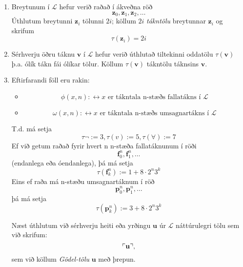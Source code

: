 \documentclass[12pt]{book}
\newcommand{\cL}{\mathcal{L}}
\newcommand{\mb}[1]{\mathbf{#1}}
\newcommand{\bz}{\mathbf{z}}
\newcommand{\bu}{\mathbf{u}}
\newcommand{\bv}{\mathbf{v}}
\DeclarePairedDelimiter{\god}{\ulcorner}{\urcorner}
\begin{document}
\begin{enumerate}[(1)]
\item Breytunum í $\cL$ hefur verið raðað í ákveðna röð
  \[ \bz_0, \bz_1, \bz_2, \dotsc\]
  Úthlutum breytunni $\bz_i$ tölunni $2i$; köllum $2i$
  \emph{tákntölu} breytunnar $\bz_i$ og skrifum
  \[\tau(\bz_i) = 2i\]
\item Sérhverju öðru táknu $\bv$ í $\cL$ hefur verið úthlutað
  tiltekinni oddatölu $\tau(\bv)$ þ.a. ólík tákn fái ólíkar tölur.
  Köllum $\tau(\bv)$ tákntölu táknsins $\bv$.
\item Eftirfarandi föll eru rakin:
  \begin{itemize}
  \item \[\phi(x,n): \leftrightarrow x \text{ er tákntala n-stæðs fallatákns  í } \cL\]
  \item \[\omega(x,n): \leftrightarrow x \text{ er tákntala n-stæðs umsagnartákns í } \cL\]
  \end{itemize}

  \begin{ath}
   T.d. má setja 
   \[ \tau{\lnot} := 3, \tau(v) := 5, \tau(\forall) := 7 \]
   Ef við getum raðað fyrir hvert n n-stæða fallatáknunum í röði
   \[\mb{f}_0^n, \mb{f}_1^n, \dotsc \]
   (endanlega eða óendanlega), þá má setja
   \[ \tau(\mb{f}_k^n) := 1 + 8\cdot 2^n 3^k \]
   Eins ef raða má n-stæðu umsagnartáknum í röð
   \[\mb{p}_0^n, \mb{p}_1^n, \dotsc \]
   þá má setja
   \[ \tau(\mb{p}_k^n) :=3 + 8\cdot 2^n 3^k \]

   Næst úthlutum við sérhverju heiti eða
   yrðingu $\bu$ úr $\cL$ náttúrulegri tölu
   sem við skrifum:
   \[ \god{\bu}, \]
   sem við köllum \emph{Gödel-tölu} $\bu$
   með þrepun.
  \end{ath}
\end{enumerate}
\end{document}
